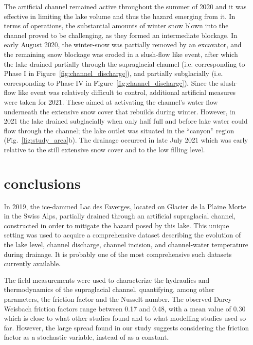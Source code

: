 The artificial channel remained active throughout the summer of 2020 and it was effective in limiting the lake volume and thus the hazard emerging from it. In terms of operations, the substantial amounts of winter snow blown into the channel proved to be challenging, as they formed an intermediate blockage. In early August 2020, the winter-snow was partially removed by an excavator, and the remaining snow blockage was eroded in a slush-flow like event, after which the lake drained partially through the supraglacial channel (i.e. corresponding to Phase I in Figure~\ref{fig:channel_discharge}), and partially subglacially (i.e. corresponding to Phase IV in Figure~\ref{fig:channel_discharge}). Since the slush-flow like event was relatively difficult to control, additional artificial measures were taken for 2021. These aimed at activating the channel’s water flow underneath the extensive snow cover that rebuilds during winter.
%
However, in 2021 the lake drained subglacially when only half full and before lake water could flow through the channel; the lake outlet was situated in the ``canyon'' region (Fig.~\ref{fig:study_area}b).  The drainage occurred in late July 2021 which was early relative to the still extensive snow cover and to the low filling level.

\section{conclusions}

In 2019, the ice-dammed Lac des Faverges, located on Glacier de la  Plaine Morte in the Swiss Alps, partially drained through an artificial supraglacial channel, constructed in order to mitigate the hazard posed by this lake.
This unique setting was used to acquire a comprehensive dataset describing the evolution of the lake level, channel discharge, channel incision, and channel-water temperature during drainage.
It is probably one of the most comprehensive such datasets currently available.


The field measurements were used to characterize the  hydraulics and thermodynamics of the supraglacial channel, quantifying, among other parameters, the friction factor and the Nusselt number.
The observed Darcy-Weisbach friction factors range between 0.17 and 0.48, with a mean value of 0.30 which is close to what other studies found and to what modelling studies used so far. However, the large spread found in our study suggests considering the friction factor as a stochastic variable, instead of as a constant.

